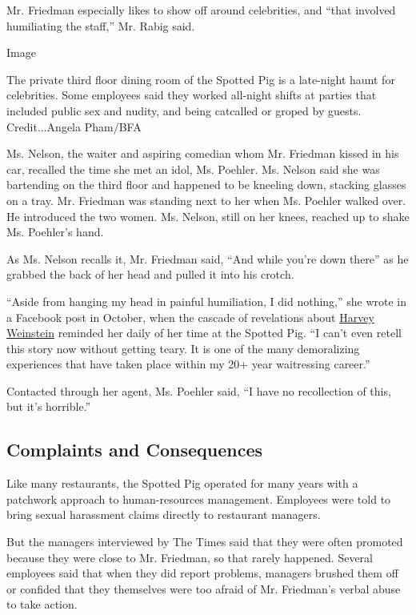 Mr. Friedman especially likes to show off around celebrities, and ``that
involved humiliating the staff,'' Mr. Rabig said.

Image

The private third floor dining room of the Spotted Pig is a late-night
haunt for celebrities. Some employees said they worked all-night shifts
at parties that included public sex and nudity, and being catcalled or
groped by guests.\\
Credit...Angela Pham/BFA

Ms. Nelson, the waiter and aspiring comedian whom Mr. Friedman kissed in
his car, recalled the time she met an idol, Ms. Poehler. Ms. Nelson said
she was bartending on the third floor and happened to be kneeling down,
stacking glasses on a tray. Mr. Friedman was standing next to her when
Ms. Poehler walked over. He introduced the two women. Ms. Nelson, still
on her knees, reached up to shake Ms. Poehler's hand.

As Ms. Nelson recalls it, Mr. Friedman said, ``And while you're down
there'' as he grabbed the back of her head and pulled it into his
crotch.

``Aside from hanging my head in painful humiliation, I did nothing,''
she wrote in a Facebook post in October, when the cascade of revelations
about
\href{https://www.nytimes.com/2017/10/05/us/harvey-weinstein-harassment-allegations.html}{Harvey
Weinstein} reminded her daily of her time at the Spotted Pig. ``I can't
even retell this story now without getting teary. It is one of the many
demoralizing experiences that have taken place within my 20+ year
waitressing career.''

Contacted through her agent, Ms. Poehler said, ``I have no recollection
of this, but it's horrible.''

\hypertarget{complaints-and-consequences}{%
\subsection{Complaints and
Consequences}\label{complaints-and-consequences}}

Like many restaurants, the Spotted Pig operated for many years with a
patchwork approach to human-resources management. Employees were told to
bring sexual harassment claims directly to restaurant managers.

But the managers interviewed by The Times said that they were often
promoted because they were close to Mr. Friedman, so that rarely
happened. Several employees said that when they did report problems,
managers brushed them off or confided that they themselves were too
afraid of Mr. Friedman's verbal abuse to take action.

